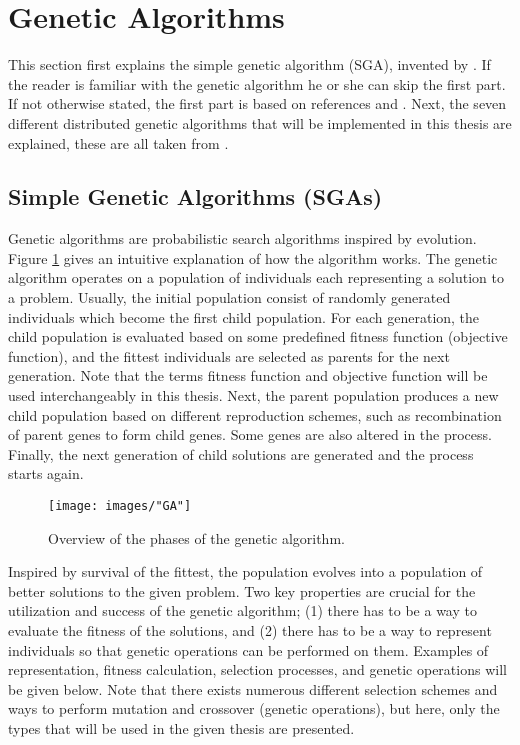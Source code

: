 \section{Genetic Algorithms}\label{section:ga}
This section first explains the simple genetic algorithm (SGA), invented by \cite{Holland}. If the reader is familiar with the genetic algorithm he or she can skip the first part. If not otherwise stated, the first part is based on references \citep{Holland} and \citep{Goldberg}. Next, the seven different distributed genetic algorithms that will be implemented in this thesis are explained, these are all taken from \cite{Gong}.


\subsection{Simple Genetic Algorithms (SGAs)}\label{subsection:sga}
Genetic algorithms are probabilistic search algorithms inspired by evolution. Figure \ref{GA} gives an intuitive explanation of how the algorithm works. The genetic algorithm operates on a population of individuals each representing a solution to a problem. Usually, the initial population consist of randomly generated individuals which become the first child population. For each generation, the child population is evaluated based on some predefined fitness function (objective function), and the fittest individuals are selected as parents for the next generation. Note that the terms fitness function and objective function will be used interchangeably in this thesis. Next, the parent population produces a new child population based on different reproduction schemes, such as recombination of parent genes to form child genes. Some genes are also altered in the process. Finally, the next generation of child solutions are generated and the process starts again.\\


\begin{figure}[h!]
\begin{center}
\texttt{[image: images/"GA"]}
\caption{Overview of the phases of the genetic algorithm.}
\label{GA}
\end{center}
\end{figure}


\noindent Inspired by survival of the fittest, the population evolves into a population of better solutions to the given problem. Two key properties are crucial for the utilization and success of the genetic algorithm; (1) there has to be a way to evaluate the fitness of the solutions, and (2) there has to be a way to represent individuals so that genetic operations can be performed on them. Examples of representation, fitness calculation, selection processes, and genetic operations will be given below. Note that there exists numerous different selection schemes and ways to perform mutation and crossover (genetic operations), but here, only the types that will be used in the given thesis are presented. \\


